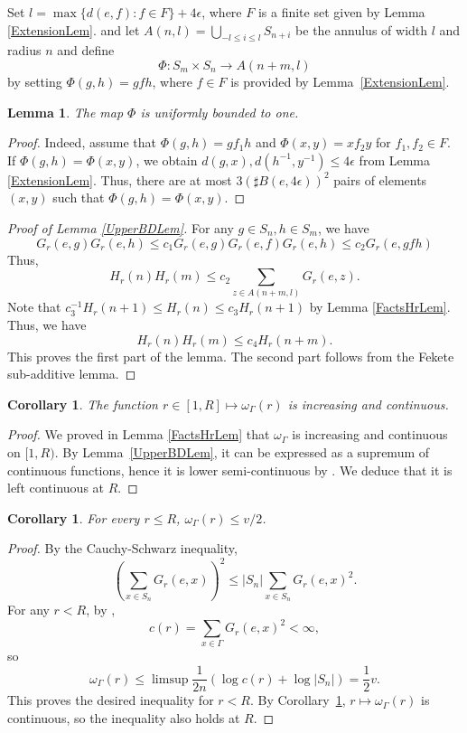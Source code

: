 \documentclass{amsart}
\newtheorem{cor}[thm]{Corollary}
\newtheorem{lem}[thm]{Lemma}
\theoremstyle{definition}
\theoremstyle{remark}
\begin{document}
Set $l=\max\{d(e,f): f\in F\}+4\epsilon$, where $F$ is a finite set given by Lemma \ref{ExtensionLem}.
and let
$A(n, l)=\bigcup\limits_{-l\le i\le l}S_{n+i}$ be the annulus of width $l$ and radius $n$ and
define $$\Phi: S_m\times S_n\to A(n+m, l)$$ by setting $\Phi(g,h)=gfh$, where $f\in F$ is provided by Lemma~\ref{ExtensionLem}.
\begin{lem}\label{BoundedToOne}
The map $\Phi$ is uniformly bounded to one.
\end{lem}
\begin{proof}
Indeed, assume that $\Phi(g,h)=gf_1h$ and $\Phi(x,y)=xf_2y$ for $f_1,f_2\in F$. If $\Phi(g,h)=\Phi(x,y)$, we obtain $d(g,x), d(h^{-1},y^{-1})\le 4\epsilon$ from Lemma \ref{ExtensionLem}. Thus, there are at most $3 (\sharp B(e,4\epsilon))^2$ pairs of  elements $(x,y)$ such that  $\Phi(g,h)=\Phi(x,y)$.
\end{proof}
\begin{proof}[Proof of Lemma \ref{UpperBDLem}]
For any $g\in S_n, h\in S_m$, we have 
$$
G_r(e,g) G_r(e,h) \le c_1 G_r(e,g) G_r(e,f) G_r(e,h)\le c_2 G_r(e, gfh) 
$$
Thus, 
$$
H_r(n) H_r(m) \le c_2\sum_{z\in A(n+m,l)} G_r(e,z).
$$
Note that $c_3^{-1} H_{r}(n+1)\le H_r(n) \le c_3H_{r}(n+1)$ by Lemma \ref{FactsHrLem}.
Thus, we have
$$H_r(n) H_r(m) \le c_4 H_r(n+m).$$
This proves the first part of the lemma.
The second part follows from the Fekete sub-additive lemma.
\end{proof}

\begin{cor}\label{lowersemicontinuity}\label{corolowersemicontinuous}
The function $r\in [1,R]\mapsto \omega_\Gamma(r)$ is increasing and continuous. %
\end{cor}

\begin{proof}
We proved in Lemma \ref{FactsHrLem} that $\omega_{\Gamma}$ is increasing and continuous on $[1, R)$.
By Lemma~\ref{UpperBDLem}, it can be expressed as a supremum of continuous functions, hence it is lower semi-continuous by \cite[Lemma~2.41]{AliprantisBorder}.
We deduce that it is left continuous at $R$.
\end{proof}

\begin{cor}\label{coroboundv/2}
For every $r\leq R$, $\omega_\Gamma(r)\leq v/2$.
\end{cor}

\begin{proof}
By the Cauchy-Schwarz inequality,
$$\left(\sum_{x\in S_n}G_r(e,x)\right)^2\leq |S_n|\sum_{x\in S_n}G_r(e,x)^2.$$
For any $r<R$, by \cite[Proposition~1.9]{GouezelLalley},
$$c(r)=\sum_{x\in \Gamma}G_r(e,x)^2<\infty,$$
so
$$\omega_\Gamma(r)\leq \limsup \frac{1}{2n}\left(\log c(r)+\log |S_n|\right)=\frac{1}{2}v.$$
This proves the desired inequality for $r<R$.
By Corollary~\ref{lowersemicontinuity}, $r\mapsto \omega_{\Gamma}(r)$ is %
continuous, so the inequality also holds at $R$.
\end{proof}
\end{document}
